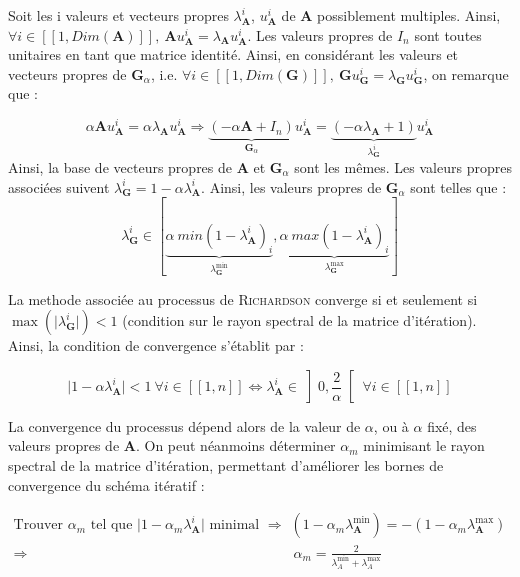 \documentclass[12pt]{report}
\newcommand{\A}{\mathbf{A}}
\newcommand{\G}{\mathbf{G}}
\begin{document}
Soit les i valeurs et vecteurs propres $\lambda_{\A}^i$, $u_{\A}^i$ de $\A$ possiblement multiples. Ainsi, $\forall i \in [\![ 1, Dim(\A)]\!], ~ \A u^i_{\A} = \lambda_{\A} u_{\A}^i$. Les valeurs propres de $I_n$ sont toutes unitaires en tant que matrice identité. Ainsi, en considérant les valeurs et vecteurs propres de $\G_{\alpha}$, i.e. $\forall i \in [\![ 1, Dim(\G)]\!], ~ \G u^i_{\G} = \lambda_{\G} u_{\G}^i$, on remarque que :

\begin{equation}
\alpha \A u^i_{\A} =\alpha \lambda_{\A} u_{\A}^i \Longrightarrow  \underbrace{\left(-\alpha \A + I_n \right)}_{\G_{\alpha}} u^i_{\A} = \underbrace{\left(- \alpha \lambda_{\A}  + 1 \right)}_{\lambda_{\G}^i} u_{\A}^i
\end{equation}
Ainsi, la base de vecteurs propres de $\A$ et $\G_{\alpha}$ sont les mêmes. Les valeurs propres associées suivent $\lambda_{\G}^i = 1 -\alpha \lambda_{\A}^i$. Ainsi, les valeurs propres de $\G_{\alpha}$  sont telles que : 
\begin{equation}
\lambda_{\G}^i \in \left[ \underbrace{\alpha~ min\left( 1 - \lambda_{\A}^i \right)_{i}}_{\lambda_{\G}^{\text{min}}}  , \underbrace{\alpha~ max\left(1 - \lambda_{\A}^i \right)_{i}}_{\lambda_{\G}^{\text{max}}}\right]
\end{equation}

La methode associée au processus de \textsc{Richardson} converge si et seulement si $\max{\left(\vert \lambda_{\G}^i \vert\right)} < 1$ (condition sur le rayon spectral de la matrice d'itération). Ainsi, la condition de convergence s'établit par : 

\begin{equation}
\vert 1 - \alpha \lambda_{\A}^i \vert < 1 ~ \forall i \in [\![ 1, n]\!] \Longleftrightarrow \lambda_{\A}^i \in \left] 0 , \frac{2}{\alpha}\right[~ \forall i \in [\![ 1, n]\!]
\end{equation}

La convergence du processus dépend alors de la valeur de $\alpha$, ou à $\alpha$ fixé, des valeurs propres de $\A$. On peut néanmoins déterminer $\alpha_{m}$ minimisant le rayon spectral de la matrice d'itération, permettant d'améliorer les bornes de convergence du schéma itératif : 

\begin{align}
\text{Trouver } \alpha_m \text{ tel que } \vert 1 - \alpha_m \lambda_{\A}^i \vert \text{ minimal } \Longrightarrow &
\left( 1 - \alpha_m \lambda_{\A}^{\text{min}}\right) = - \left( 1 - \alpha_m \lambda_{\A}^{\text{max}}\right)  \\
\Longrightarrow& ~ \alpha_m = \frac{2}{\lambda_{A}^{\text{min}} + \lambda_{A}^{\text{max}}} 
\end{align}
\end{document}
